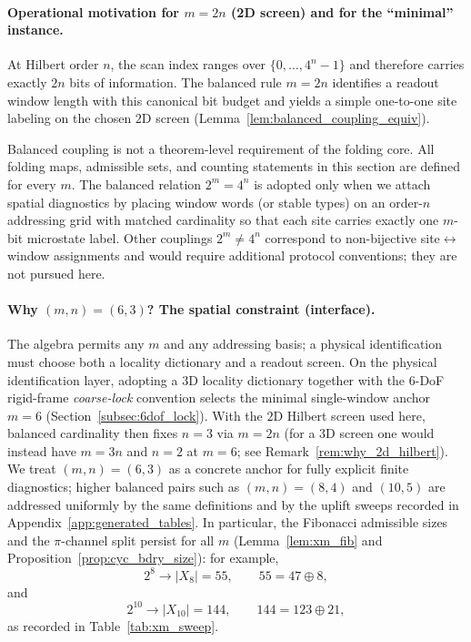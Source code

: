 \paragraph{Operational motivation for $m=2n$ (2D screen) and for the ``minimal'' instance.}
At Hilbert order $n$, the scan index ranges over $\{0,\dots,4^n-1\}$ and therefore carries exactly $2n$ bits of information.
The balanced rule $m=2n$ identifies a readout window length with this canonical bit budget and yields a simple one-to-one site labeling on the chosen $2$D screen (Lemma~\ref{lem:balanced_coupling_equiv}).
\begin{remark}\label{rem:balanced_coupling_convention}
Balanced coupling is not a theorem-level requirement of the folding core.
All folding maps, admissible sets, and counting statements in this section are defined for every $m$.
The balanced relation $2^m=4^n$ is adopted only when we attach spatial diagnostics by placing window words (or stable types) on an order-$n$ addressing grid with matched cardinality so that each site carries exactly one $m$-bit microstate label.
Other couplings $2^m\neq 4^n$ correspond to non-bijective site$\leftrightarrow$window assignments and would require additional protocol conventions; they are not pursued here.
\end{remark}
\paragraph{Why $(m,n)=(6,3)$? The spatial constraint (interface).}
The algebra permits any $m$ and any addressing basis; a physical identification must choose both a locality dictionary and a readout screen.
On the physical identification layer, adopting a $3$D locality dictionary together with the 6-DoF rigid-frame \emph{coarse-lock} convention selects the minimal single-window anchor $m=6$ (Section~\ref{subsec:6dof_lock}).
With the $2$D Hilbert screen used here, balanced cardinality then fixes $n=3$ via $m=2n$ (for a $3$D screen one would instead have $m=3n$ and $n=2$ at $m=6$; see Remark~\ref{rem:why_2d_hilbert}).
We treat $(m,n)=(6,3)$ as a concrete anchor for fully explicit finite diagnostics; higher balanced pairs such as $(m,n)=(8,4)$ and $(10,5)$ are addressed uniformly by the same definitions and by the uplift sweeps recorded in Appendix~\ref{app:generated_tables}.
In particular, the Fibonacci admissible sizes and the $\pi$-channel split persist for all $m$ (Lemma~\ref{lem:xm_fib} and Proposition~\ref{prop:cyc_bdry_size}): for example,
\[
2^8\to |X_8|=55,\qquad 55=47\oplus 8,
\]
and
\[
2^{10}\to |X_{10}|=144,\qquad 144=123\oplus 21,
\]
as recorded in Table~\ref{tab:xm_sweep}.

